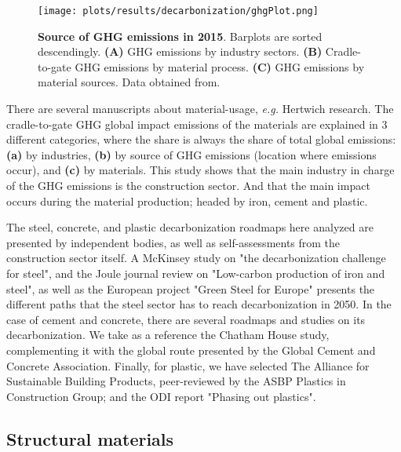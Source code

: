 \begin{figure}[ht!]
  \centering
  \texttt{[image: plots/results/decarbonization/ghgPlot.png]}
  \caption[Source of GHG emissions in 2015]{\textbf{Source of GHG emissions in 2015}. Barplots are sorted descendingly. \textbf{(A)}  GHG emissions by industry sectors. \textbf{(B)} Cradle-to-gate GHG emissions by material process. \textbf{(C)} GHG emissions by material sources. Data obtained from.\autocite{hertwich2021increased}}
  \label{fig:ghg}
\end{figure}


There are several manuscripts about material-usage, \textit{e.g.} Hertwich research.\autocite{asbp_2020} The cradle-to-gate GHG global impact emissions of the materials are explained in 3 different categories, where the share is always the share of total global emissions: \textbf{(a)} by industries, \textbf{(b)} by source of GHG emissions (location where emissions occur), and \textbf{(c)} by materials. This study shows that the main industry in charge of the GHG emissions is the construction sector. And that the main impact occurs during the material production; headed by iron, cement and plastic.

The steel, concrete, and plastic decarbonization roadmaps here analyzed are presented by independent bodies, as well as self-assessments from the construction sector itself. A McKinsey study on "the decarbonization challenge for steel",\autocite{hoffmann2021decarbonization} and the Joule journal review on "Low-carbon production of iron and steel"\autocite{fan2021low}, as well as the European project "Green Steel for Europe"\autocite{elkerbout2021impact} presents the different paths that the steel sector has to reach decarbonization in 2050. In the case of cement and concrete, there are several roadmaps and studies on its decarbonization. We take as a reference the Chatham House study,\autocite{lehne2018making} complementing it with the global route presented by the Global Cement and Concrete Association.\autocite{cement2021concrete} Finally, for plastic, we have selected The Alliance for Sustainable Building Products, peer-reviewed by the ASBP Plastics in Construction Group;\autocite{asbp_2020} and the ODI report "Phasing out plastics".\autocite{pickard2020phasing}

\subsection{Structural materials}
\label{sec:materials_used_for_structural_purposes}

